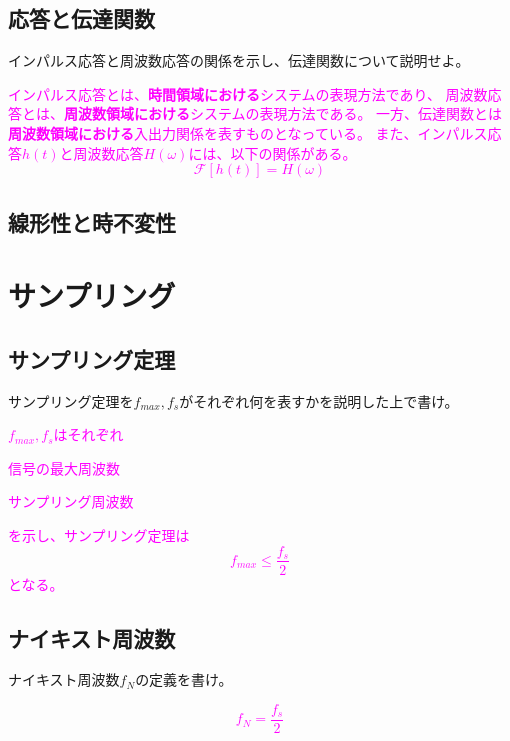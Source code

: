 \documentclass[twocolumn]{ltjsarticle}
\newcommand{\visible}{visible}
\newcommand{\ans}[1]{
\begin{tcolorbox}[\visible]
\textcolor{magenta}{#1}
\end{tcolorbox}
}
\begin{document}
\subsection{応答と伝達関数}
インパルス応答と周波数応答の関係を示し、伝達関数について説明せよ。
\ans{
    インパルス応答とは、\textbf{時間領域における}システムの表現方法であり、
    周波数応答とは、\textbf{周波数領域における}システムの表現方法である。
    一方、伝達関数とは\textbf{周波数領域における}入出力関係を表すものとなっている。
    また、インパルス応答$h(t)$と周波数応答$H(\omega)$には、以下の関係がある。
    $$\mathcal{F}[h(t)]=H(\omega)$$
}
\subsection{線形性と時不変性}

\clearpage
\section{サンプリング}
\subsection{サンプリング定理}
サンプリング定理を$f_{max},f_s$がそれぞれ何を表すかを説明した上で書け。
\ans{
    $f_{max},f_s$はそれぞれ
    \begin{description}
        \centering
        \item[$f_{max}$]信号の最大周波数
        \item[$f_s$]サンプリング周波数  
    \end{description}
    を示し、サンプリング定理は
    $$f_{max}\leq\frac{f_s}{2}$$
    となる。
}
\subsection{ナイキスト周波数}
ナイキスト周波数$f_N$の定義を書け。
\ans{$$f_N=\frac{f_s}{2}$$}
\end{document}
